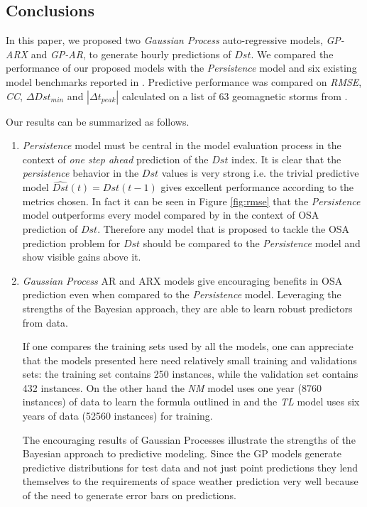 \documentclass[referee,a4paper,12pt,traditabstract]{swsc}
\begin{document}
\begin{linenumbers}
\section{Conclusions}

In this paper, we proposed two \emph{Gaussian Process} auto-regressive models, \emph{GP-ARX} and \emph{GP-AR}, to generate hourly predictions of $Dst$. We compared the performance of our proposed models with the \emph{Persistence} model and six existing model benchmarks reported in \citet{Ji2012}. Predictive performance was compared on \emph{RMSE}, \emph{CC}, $\Delta Dst_{min}$ and $|\Delta t_{peak}|$ calculated on a list of 63 geomagnetic storms from \cite{Ji2012}.

Our results can be summarized as follows.
   \begin{enumerate}
      \item \emph{Persistence} model must be central in the model evaluation process in the context of \emph{one step ahead} prediction of the $Dst$ index. It is clear that the \emph{persistence} behavior in the $Dst$ values is very strong i.e. the trivial predictive model $\hat{Dst}(t) = Dst(t-1)$ gives excellent performance according to the metrics chosen. In fact it can be seen in Figure \ref{fig:rmse} that the \emph{Persistence} model outperforms every model compared by \citet{Ji2012} in the context of OSA prediction of $Dst$. Therefore any model that is proposed to tackle the OSA prediction problem for $Dst$ should be compared to the \emph{Persistence} model and show visible gains above it.
      
      \item \emph{Gaussian Process} AR and ARX models give encouraging benefits in OSA prediction even when compared to the \emph{Persistence} model. Leveraging the strengths of the Bayesian approach, they are able to learn robust predictors from data. 
      
      If one compares the training sets used by all the models, one can appreciate that the models presented here need relatively small training and validations sets: the training set contains 250 instances, while the validation set contains 432 instances. On the other hand the \emph{NM} model uses one year (8760 instances) of data to learn the formula outlined in \citet{balikhin:narmax} and the \emph{TL} model uses six years of data (52560 instances) for training. 
      
      The encouraging results of Gaussian Processes illustrate the strengths of the Bayesian approach to predictive modeling. Since the GP models generate predictive distributions for test data and not just point predictions they lend themselves to the requirements of space weather prediction very well because of the need to generate error bars on predictions.
   \end{enumerate}
   


\end{linenumbers}
\end{document}
